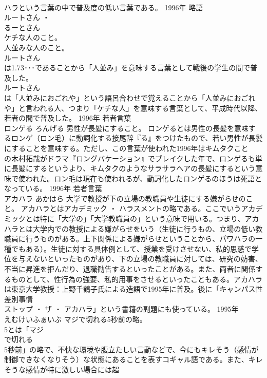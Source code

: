 \documentclass[8pt]{extreport}
\begin{document}
\begin{CJK}{UTF8}{min}
\\	ハラという言葉の中で普及度の低い言葉である。	1996年	略語	
\\	ルートさん ・ 
\\	るーとさん	
\\	ケチな人のこと。 
\\	人並みな人のこと。	
\\	ルートさん
\\	は1.73･･･であることから「人並み」を意味する言葉として戦後の学生の間で普及した。 
\\	ルートさん
\\	は「人並みにおごれや」という語呂合わせで覚えることから「人並みにおごれや」と言われる人、つまり「ケチな人」を意味する言葉として、平成時代以降、若者の間で普及した。	1996年	若者言葉	
\\	ロンゲる	ろんげる	男性が長髪にすること。	ロンゲるとは男性の長髪を意味するロンゲ（ロン毛）に動詞化する接尾辞『る』をつけたもので、若い男性が長髪にすることを意味する。ただし、この言葉が使われた1996年はキムタクこと
\\	の木村拓哉がドラマ『ロングバケーション』でブレイクした年で、ロンゲるも単に長髪にするというより、キムタクのようなサラサラヘアの長髪にするという意味で使われた。ロン毛は現在も使われるが、動詞化したロンゲるのほうは死語となっている。	1996年	若者言葉	
\\	アカハラ	あかはら	大学で教授が下の立場の教職員や生徒にする嫌がらせのこと。	アカハラとはアカデミック ・ ハラスメントの略である。ここでいうアカデミックとは特に「大学の」「大学教職員の」という意味で用いる。つまり、アカハラとは大学内での教授による嫌がらせをいう（生徒に行うもの、立場の低い教職員に行うものがある。上下関係による嫌がらせということから、パワハラの一種でもある）。生徒に対する具体例として、授業を受けさせない、私的思惑で学位を与えないといったものがあり、下の立場の教職員に対しては、研究の妨害、不当に昇進を拒んだり、退職勧告するといったことがある。また、両者に関係するものとして、性行為の強要、私的用事をさせるといったこともある。アカハラは東京大学教授：上野千鶴子氏による造語で1995年に普及。後に「キャンパス性差別事情 
\\	ストップ ・ ザ ・ アカハラ」という書籍の副題にも使っている。	1995年	
\\	えむけいふぁいぶ	マジで切れる5秒前の略。	
\\	5とは「マジ
\\	で切れる
\\	5秒前」の略で、不快な環境や腹立たしい言動などで、今にもキレそう（感情が制御できなくなりそう）な状態にあることを表すコギャル語である。また、キレそうな感情が特に激しい場合には超

\end{CJK}
\end{document}
